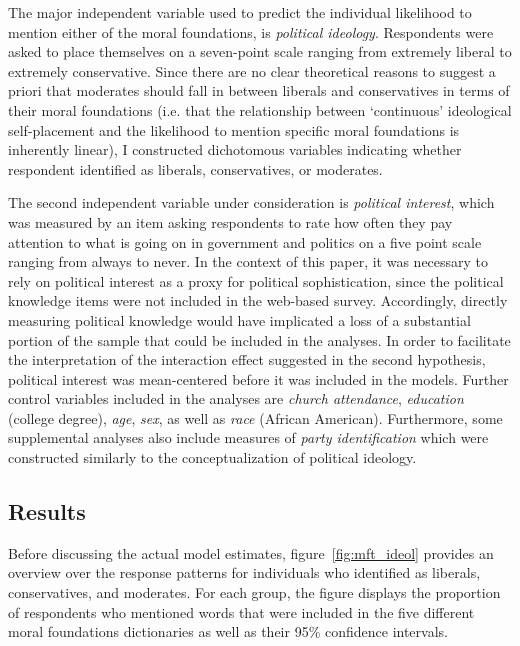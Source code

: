 \documentclass[12pt]{paper}
\begin{document}
The major independent variable used to predict the individual likelihood to mention either of the moral foundations, is \textit{political ideology}. Respondents were asked to place themselves on a seven-point scale ranging from extremely liberal to extremely conservative. Since there are no clear theoretical reasons to suggest a priori that moderates should fall in between liberals and conservatives in terms of their moral foundations (i.e. that the relationship between `continuous' ideological self-placement and the likelihood to mention specific moral foundations is inherently linear), I constructed dichotomous variables indicating whether respondent identified as liberals, conservatives, or moderates.

The second independent variable under consideration is \textit{political interest}, which was measured by an item asking respondents to rate how often they pay attention to what is going on in government and politics on a five point scale ranging from always to never. In the context of this paper, it was necessary to rely on political interest as a proxy for political sophistication, since the political knowledge items were not included in the web-based survey. Accordingly, directly measuring political knowledge would have implicated a loss of a substantial portion of the sample that could be included in the analyses. In order to facilitate the interpretation of the interaction effect suggested in the second hypothesis, political interest was mean-centered before it was included in the models. Further control variables included in the analyses are \textit{church attendance}, \textit{education} (college degree), \textit{age}, \textit{sex}, as well as \textit{race} (African American). Furthermore, some supplemental analyses also include measures of \textit{party identification} which were constructed similarly to the conceptualization of political ideology.


\subsection{Results}

Before discussing the actual model estimates, figure~\ref{fig:mft_ideol} provides an overview over the response patterns for individuals who identified as liberals, conservatives, and moderates. For each group, the figure displays the proportion of respondents who mentioned words that were included in the five different moral foundations dictionaries as well as their 95\% confidence intervals.
\end{document}
